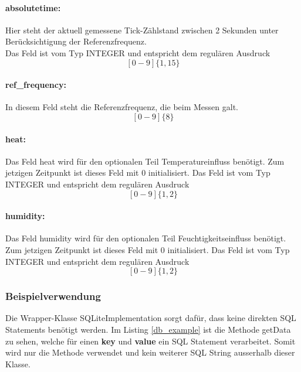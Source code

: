     \paragraph{absolutetime:}
    Hier steht der aktuell gemessene Tick-Zählstand zwischen 2 Sekunden unter Berücksichtigung der Referenzfrequenz.\\
    Das Feld ist vom Typ INTEGER und entspricht dem regulären Ausdruck
    $$[0-9]\{1,15\}$$
    \paragraph{ref\_frequency:}
    In diesem Feld steht die Referenzfrequenz, die beim Messen galt.
    $$[0-9]\{8\}$$
    \paragraph{heat:}
    Das Feld heat wird für den optionalen Teil Temperatureinfluss benötigt. Zum jetzigen Zeitpunkt ist dieses Feld mit 0 initialisiert.
    Das Feld ist vom Typ INTEGER und entspricht dem regulären Ausdruck
    $$[0-9]\{1,2\}$$
    \paragraph{humidity:}
    Das Feld humidity wird für den optionalen Teil Feuchtigkeitseinfluss benötigt. Zum jetzigen Zeitpunkt ist dieses Feld mit 0 initialisiert.
    Das Feld ist vom Typ INTEGER und entspricht dem regulären Ausdruck
    $$[0-9]\{1,2\}$$
    
    \subsubsection{Beispielverwendung}
    Die Wrapper-Klasse SQLiteImplementation sorgt dafür, dass keine direkten SQL Statements benötigt werden. Im Listing \ref{db_example} ist die Methode getData zu sehen, welche für einen \textbf{key} und \textbf{value} ein SQL Statement verarbeitet. Somit wird nur die Methode verwendet und kein weiterer SQL String ausserhalb dieser Klasse.
    
    